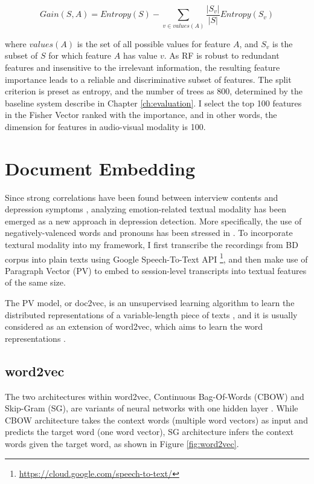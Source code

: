\begin{equation}
    Gain(S,A) = Entropy(S) - \sum_{v \in values(A)} \frac{|S_v|}{|S|} Entropy(S_v)
\end{equation}

where $values(A)$ is the set of all possible values for feature $A$, and $S_v$ is the subset of $S$ for which feature $A$ has value $v$. As RF is robust to redundant features and insensitive to the irrelevant information, the resulting feature importance leads to a reliable and discriminative subset of features. The split criterion is preset as entropy, and the number of trees as 800, determined by the baseline system describe in Chapter \ref{ch:evaluation}. I select the top 100 features in the Fisher Vector ranked with the importance, and in other words, the dimension for features in audio-visual modality is 100.



\section{Document Embedding}

Since strong correlations have been found between interview contents and depression symptoms \cite{morales2016, pampouchidou2016}, analyzing emotion-related textual modality has been emerged as a new approach in depression detection. More specifically, the use of negatively-valenced words and pronouns has been stressed in \cite{morales2016}. To incorporate textural modality into my framework, I first transcribe the recordings from BD corpus into plain texts using Google Speech-To-Text API \footnote{\url{https://cloud.google.com/speech-to-text/}}, and then make use of Paragraph Vector (PV) \cite{mikolov2014} to embed to session-level transcripts into textual features of the same size.

The PV model, or doc2vec, is an unsupervised learning algorithm to learn the distributed representations of a variable-length piece of texts \cite{mikolov2014}, and it is usually considered as an extension of word2vec, which aims to learn the word representations \cite{mikolov2013}.  

\subsection{word2vec}

The two architectures within word2vec, Continuous Bag-Of-Words (CBOW) and Skip-Gram (SG), are variants of neural networks with one hidden layer \cite{mikolov2013}. While CBOW architecture takes the context words (multiple word vectors) as input and predicts the target word (one word vector), SG architecture infers the context words given the target word, as shown in Figure \ref{fig:word2vec}. 

